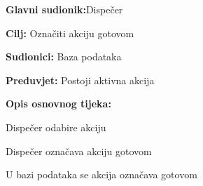 		    	\noindent {}
		    	\begin{packed_item}
		    		
		    		\item \textbf{Glavni sudionik:}Dispečer
		    		\item  \textbf{Cilj:} Označiti akciju gotovom
		    		\item  \textbf{Sudionici:} Baza podataka
		    		\item  \textbf{Preduvjet:} Postoji aktivna akcija
		    		\item  \textbf{Opis osnovnog tijeka:}
		    		
		    		\item[] \begin{packed_enum}
		    			
		    			\item Dispečer odabire akciju
		    			\item Dispečer označava akciju gotovom
		    			\item U bazi podataka se akcija označava gotovom\\
		    		\end{packed_enum}
		    	\end{packed_item}
	    	
